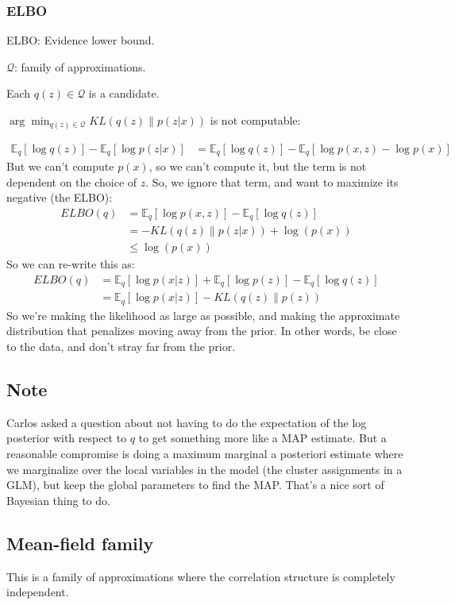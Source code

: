 \documentclass{article}
\newcommand{\E}{ \ensuremath{ \mathbb{E} }}
\begin{document}
\subsubsection{ELBO}
ELBO: Evidence lower bound.

$\mathcal{Q}$: family of approximations.

Each $q(z)\in\mathcal{Q}$ is a candidate.

$\arg\min_{q(z)\in\mathcal{Q}}KL \left(q(z) \middle\| p(z|x)\right)$ is not computable:

\begin{align*}
  \E_q\left[\log q(z)\right] - \E_q\left[\log p(z|x)\right] &= \E_q\left[\log q(z)\right] - \E_q\left[\log p(x,z) - \log p(x)\right]
\end{align*}
But we can't compute $p(x)$, so we can't compute it, but the term is not dependent on the choice of $z$. So, we ignore that term,
and want to maximize its negative (the ELBO):
\begin{align*}
  ELBO(q)&=\E_q\left[\log p(x,z)\right]-\E_q\left[\log q(z)\right]
  \\
  &=-KL \left(q(z) \middle\| p(z|x)\right) + \log(p(x))
  \\
  &\leq \log(p(x))
\end{align*}
So we can re-write this as:
\begin{align*}
  ELBO(q)&=\E_q\left[\log p(x|z)\right]+\E_q\left[\log p(z)\right]-\E_q\left[\log q(z)\right]
  \\
  &=\E_q\left[\log p(x|z)\right]-KL\left(q(z)\middle\|p(z)\right)
\end{align*}
So we're making the likelihood as large as possible, and making the
approximate distribution that penalizes moving away from the prior. In other words,
be close to the data, and don't stray far from the prior.

\subsection{Note}
Carlos asked a question about not having to do the expectation of the log posterior with respect to $q$ to get
something more like a MAP estimate. But a reasonable compromise is doing a maximum marginal a posteriori estimate
where we marginalize over the local variables in the model (the cluster assignments in a GLM), but keep the global
parameters to find the MAP. That's a nice sort of Bayesian thing to do.

\subsection{Mean-field family}
This is a family of approximations where the correlation structure is completely independent.
\end{document}
